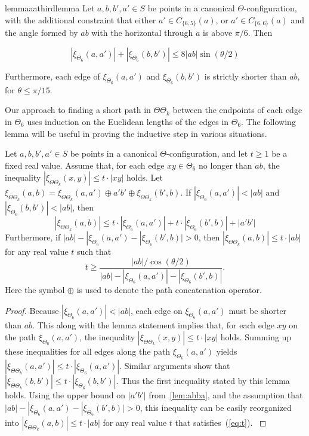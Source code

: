 \documentclass[runningheads,a4paper]{llncs}
\newcommand{\ABox}{
\raisebox{3pt}{\framebox[6pt]{\rule{6pt}{0pt}}}
}
\newcommand{\pp}{\xi}
\begin{document}
\begin{restatable}{lemma}{aathirdlemma}
\label{lem:paa5}
Let $a, b, b', a' \in S$ be points in a canonical $\Theta$-configuration, with the additional constraint that either  
$a' \in C_{\{6,5\}}(a)$, or $a' \in C_{\{6,6\}}(a)$ and the angle formed by $ab$ with the horizontal through $a$ is above $\pi/6$. 
Then \begin{small}
\begin{equation*}
|\pp_{\Theta_6}(a, a')| + |\pp_{\Theta_6}(b, b')| \le 8|ab|\sin(\theta/2)
\end{equation*}
\end{small}Furthermore, each edge of $\pp_{\Theta_6}(a,a')$ and $\pp_{\Theta_6}(b,b')$ is strictly shorter than $ab$, for $\theta \le \pi/15$. \end{restatable}


Our approach to finding a short path in $\Theta\Theta_k$ between the endpoints of each edge in $\Theta_6$ uses induction on the Euclidean lengths of the edges in $\Theta_6$. The following lemma will be useful in proving the inductive step in various situations. 

\begin{lemma}
\label{lem:pab}
Let $a, b, b', a' \in S$ be points in a canonical $\Theta$-configuration, and let $t \ge 1$ be a fixed real value.  Assume that, for each edge $xy \in \Theta_6$ no longer than $ab$, the inequality $|\pp_{\Theta\Theta_k}(x,y)| \le t\cdot|xy|$ holds. 
Let $\pp_{\Theta\Theta_k}(a, b) = \pp_{\Theta\Theta_k}(a, a') \oplus a'b' \oplus \pp_{\Theta\Theta_k}(b', b)$. 
If $|\pp_{\Theta_6}(a, a')| < |ab|$ and $|\pp_{\Theta_6}(b, b')| < |ab|$, then 
\[
|\pp_{\Theta\Theta_k}(a, b)| \le t\cdot |\pp_{\Theta_6}(a, a')| + t\cdot |\pp_{\Theta_6}(b',b)| + |a'b'|
\]
Furthermore, if $|ab|-|\pp_{\Theta_6}(a, a') - |\pp_{\Theta_6}(b',b)| > 0$, then 
$|\pp_{\Theta\Theta_k}(a, b)| \le t\cdot |ab|$  for any real value $t$ such that 
\begin{equation}
\label{eq:t}
t \ge \frac{|ab|/\cos(\theta/2)}{|ab|-|\pp_{\Theta_6}(a, a')| - |\pp_{\Theta_6}(b',b)|}.
\end{equation}
Here the symbol $\oplus$ is used to denote the path concatenation operator. 
\end{lemma}
\begin{proof}
Because $|\pp_{\Theta_6}(a, a')| < |ab|$, each edge on $\pp_{\Theta_6}(a, a')$ must be shorter than $ab$. This along with the lemma statement implies that, for each edge $xy$ on the path $\pp_{\Theta_6}(a, a')$, the inequality $|\pp_{\Theta\Theta_k}(x,y)| \le t\cdot|xy|$ holds. Summing up these inequalities for all edges along the path $\pp_{\Theta_6}(a, a')$ yields $|\pp_{\Theta\Theta_k}(a, a')| \le t\cdot |\pp_{\Theta_6}(a, a')|$.  Similar arguments show that $|\pp_{\Theta\Theta_k}(b, b')| \le t\cdot |\pp_{\Theta_6}(b, b')|$. Thus the 
first inequality stated by this lemma holds. 
Using the upper bound on $|a'b'|$ from~\autoref{lem:abba}, and the assumption that 
$|ab|-|\pp_{\Theta_6}(a, a') - |\pp_{\Theta_6}(b',b)| > 0$, this inequality can be easily reorganized into $|\pp_{\Theta\Theta_k}(a, b)| \le t\cdot|ab|$ for any real value $t$ that satisfies~(\ref{eq:t}).
{\hfill\ABox}\end{proof}
\end{document}
